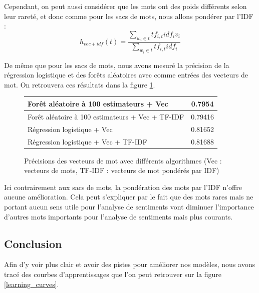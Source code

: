 \documentclass{article}
\begin{document}
Cependant, on peut aussi considérer que les mots ont des poids différents selon leur rareté, et donc comme pour les sacs de mots, nous allons pondérer par l'IDF :
$$
h_{vec+idf}(t) = \frac{\sum_{w_{i} \in t}{tf_{i, t}idf_{i}v_{i}}}{\sum_{w_{i} \in t}{tf_{i, t}idf_{i}}}
$$

De même que pour les sacs de mots, nous avons mesuré la précision de la régression logistique et des forêts aléatoires avec comme entrées des vecteurs de mot. On retrouvera ces résultats dans la figure \ref{results_vec}.

\begin{figure}[h]
\begin{center}
\begin{tabular}{|l|c|}
	\hline
	Forêt aléatoire à 100 estimateurs + Vec & 0.7954 \\
	\hline
	Forêt aléatoire à 100 estimateurs + Vec + TF-IDF & 0.79416 \\
	\hline
	Régression logistique + Vec & 0.81652 \\
	\hline
	Régression logistique + Vec + TF-IDF & 0.81688 \\
	\hline
\end{tabular}
\caption{Précisions des vecteurs de mot avec différents algorithmes (Vec : vecteurs de mots, TF-IDF : vecteurs de mot pondérés par IDF)}
\label{results_vec}
\end{center}
\end{figure}

Ici contrairement aux sacs de mots, la pondération des mots par l'IDF n'offre aucune amélioration. Cela peut s'expliquer par le fait que des mots rares mais ne portant aucun sens utile pour l'analyse de sentiments vont diminuer l'importance d'autres mots importants pour l'analyse de sentiments mais plus courants. 

\subsection{Conclusion}

Afin d'y voir plus clair et avoir des pistes pour améliorer nos modèles, nous avons tracé des courbes d'apprentissages que l'on peut retrouver sur la figure \ref{learning_curves}.
\end{document}
